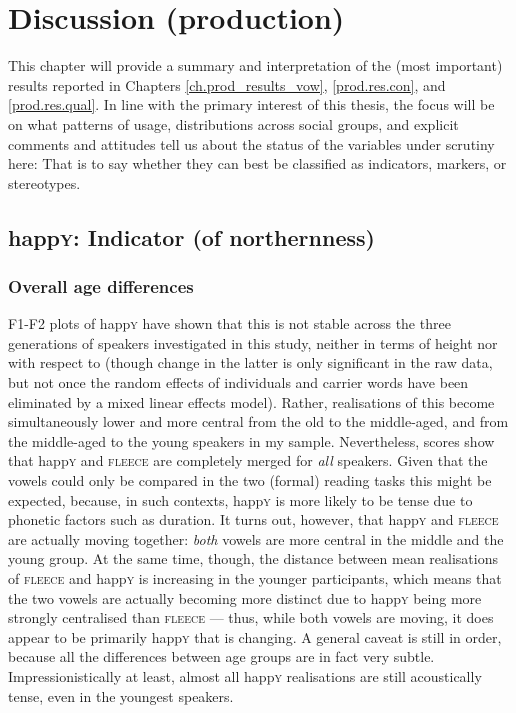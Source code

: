 \chapter{Discussion (production)}
\label{ch.prod_discussion}

This chapter will provide a summary and interpretation of the (most important) results reported in Chapters \ref{ch.prod_results_vow}, \ref{prod.res.con}, and \ref{prod.res.qual}.
In line with the primary interest of this thesis, the focus will be on what patterns of usage, distributions across social groups, and explicit comments and attitudes tell us about the status of the variables under scrutiny here: That is to say whether they can best be classified as indicators, markers, or stereotypes.

\section{happ\textrm{\textsc{y}}: Indicator (of northernness)}
\label{prod.disc.happy}

\subsection{Overall age differences}
\label{prod.disc.happy.age}

F1-F2 plots of happ\textsc{y} have shown that this  is not stable across the three generations of speakers investigated in this study, neither in terms of height nor with respect to  (though change in the latter is only significant in the raw data, but not once the random effects of individuals and carrier words have been eliminated by a mixed linear effects model).
Rather, realisations of this  become simultaneously lower and more central from the old to the middle-aged, and from the middle-aged to the young speakers in my sample.
Nevertheless,  scores show that happ\textsc{y} and \textsc{fleece} are completely merged for \emph{all} speakers.
Given that the vowels could only be compared in the two (formal) reading tasks this might be expected, because, in such contexts, happ\textsc{y} is more likely to be tense due to phonetic factors such as duration.
It turns out, however, that happ\textsc{y} and \textsc{fleece} are actually moving together: \emph{both} vowels are more central in the middle and the young group.
At the same time, though, the distance between mean realisations of \textsc{fleece} and happ\textsc{y} is increasing in the younger participants, which means that the two vowels are actually becoming more distinct due to happ\textsc{y} being more strongly centralised than \textsc{fleece} --- thus, while both vowels are moving, it does appear to be primarily happ\textsc{y} that is changing.
A general caveat is still in order, because all the differences between age groups are in fact very subtle.
Impressionistically at least, almost all happ\textsc{y} realisations are still acoustically tense, even in the youngest speakers.

